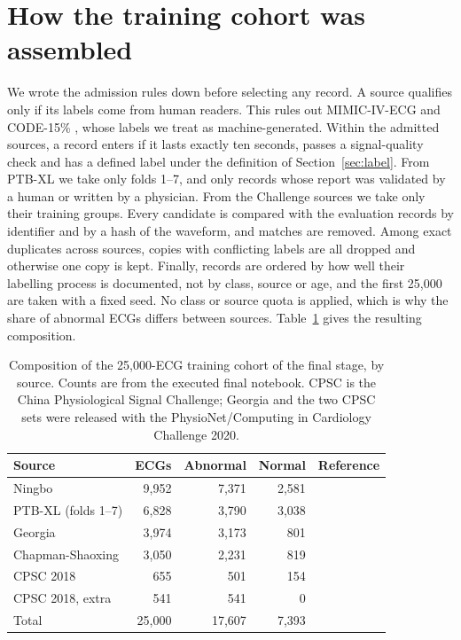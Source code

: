 \documentclass[letterpaper,11pt]{article}
\begin{document}
\printbibliography[title={References}]

\clearpage
\appendix

\section{How the training cohort was assembled}
\label{app:cohort}

We wrote the admission rules down before selecting any record. A source qualifies only if its labels come from human readers. This rules out MIMIC-IV-ECG \parencite{gow2023mimicivecg} and CODE-15\% \parencite{ribeiro2021code15}, whose labels we treat as machine-generated. Within the admitted sources, a record enters if it lasts exactly ten seconds, passes a signal-quality check and has a defined label under the definition of Section~\ref{sec:label}. From PTB-XL we take only folds 1--7, and only records whose report was validated by a human or written by a physician. From the Challenge sources we take only their training groups. Every candidate is compared with the evaluation records by identifier and by a hash of the waveform, and matches are removed. Among exact duplicates across sources, copies with conflicting labels are all dropped and otherwise one copy is kept. Finally, records are ordered by how well their labelling process is documented, not by class, source or age, and the first 25,000 are taken with a fixed seed. No class or source quota is applied, which is why the share of abnormal ECGs differs between sources. Table~\ref{tab:cohort} gives the resulting composition.

\begin{table}[H]
  \centering
  \caption{Composition of the 25,000-ECG training cohort of the final stage, by source. Counts are from the executed final notebook. CPSC is the China Physiological Signal Challenge; Georgia and the two CPSC sets were released with the PhysioNet/Computing in Cardiology Challenge 2020.}
  \label{tab:cohort}
  \small
  \begin{tabular}{lrrrl}
    \toprule
    Source & ECGs & Abnormal & Normal & Reference \\
    \midrule
    Ningbo            & 9,952 & 7,371 & 2,581 & \textcite{zheng2022ningbo} \\
    PTB-XL (folds 1--7) & 6,828 & 3,790 & 3,038 & \textcite{wagner2020ptbxl} \\
    Georgia           & 3,974 & 3,173 &   801 & \textcite{perezalday2020classification} \\
    Chapman-Shaoxing  & 3,050 & 2,231 &   819 & \textcite{zheng2020database} \\
    CPSC 2018         &   655 &   501 &   154 & \textcite{liu2018open} \\
    CPSC 2018, extra  &   541 &   541 &     0 & \textcite{perezalday2020classification} \\
    \midrule
    Total             & 25,000 & 17,607 & 7,393 & \\
    \bottomrule
  \end{tabular}
\end{table}
\end{document}
